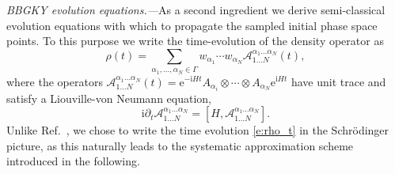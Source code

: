 \documentclass[aps,prl,showpacs,amsmath,amssymb,superscriptaddress,reprint,10pt]{revtex4-1}
\newcommand\ee{{\mathrm{e}}}
\newcommand\ii{{\mathrm{i}}}
\newcommand{\Com}[2]{\left[{#1},{#2}\right]}
\begin{document}
{\em BBGKY evolution equations.---}As a second ingredient we derive semi-classical evolution equations with which to propagate the sampled initial phase space points. To this purpose we write the time-evolution of the density operator as
\begin{equation}\label{e:rho_t}
\rho(t)=\sum_{\alpha_1,\dotsc,\alpha_N\in\Gamma}w_{\alpha_1}\cdots w_{\alpha_N} \mathscr{A}_{1\dotsc N}^{\alpha_1\dotsc\alpha_N}(t),
\end{equation}
where the operators $\mathscr{A}_{1\dotsc N}^{\alpha_1\dotsc\alpha_N}(t)=\ee^{-\ii Ht}A_{\alpha_i}\otimes\cdots\otimes A_{\alpha_N}\ee^{\ii Ht}$  have unit trace and satisfy a Liouville-von Neumann equation,
\begin{equation}\label{VNeqdWA}
\ii\partial_t \mathscr{A}_{1\dotsc N}^{\alpha_1\dotsc\alpha_N} = \Com{H}{\mathscr{A}_{1\dotsc N}^{\alpha_1\dotsc\alpha_N}}.
\end{equation}
Unlike Ref.~\cite{Schachenmayer_etal15}, we chose to write the time evolution \eqref{e:rho_t} in the Schr\"odinger picture, as this naturally leads to the systematic approximation scheme introduced in the following.
\end{document}
